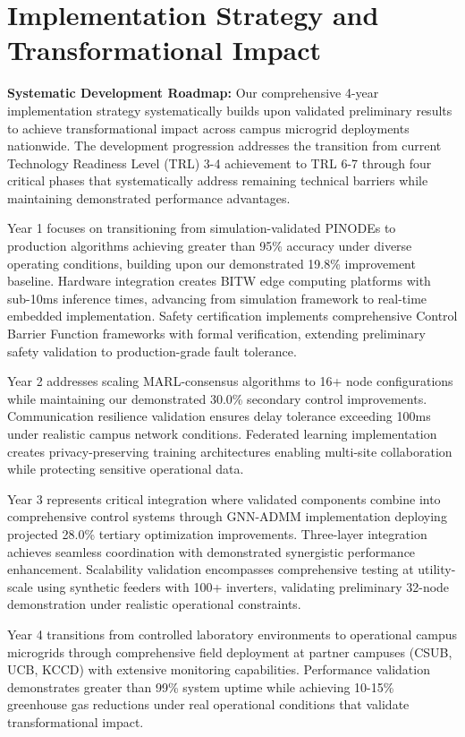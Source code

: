 \documentclass[12pt]{article}
\begin{document}
\section{Implementation Strategy and Transformational Impact}

\textbf{Systematic Development Roadmap:} Our comprehensive 4-year implementation strategy systematically builds upon validated preliminary results to achieve transformational impact across campus microgrid deployments nationwide. The development progression addresses the transition from current Technology Readiness Level (TRL) 3-4 achievement to TRL 6-7 through four critical phases that systematically address remaining technical barriers while maintaining demonstrated performance advantages.

Year 1 focuses on transitioning from simulation-validated PINODEs to production algorithms achieving greater than 95\% accuracy under diverse operating conditions, building upon our demonstrated 19.8\% improvement baseline. Hardware integration creates BITW edge computing platforms with sub-10ms inference times, advancing from simulation framework to real-time embedded implementation. Safety certification implements comprehensive Control Barrier Function frameworks with formal verification, extending preliminary safety validation to production-grade fault tolerance.

Year 2 addresses scaling MARL-consensus algorithms to 16+ node configurations while maintaining our demonstrated 30.0\% secondary control improvements. Communication resilience validation ensures delay tolerance exceeding 100ms under realistic campus network conditions. Federated learning implementation creates privacy-preserving training architectures enabling multi-site collaboration while protecting sensitive operational data.

Year 3 represents critical integration where validated components combine into comprehensive control systems through GNN-ADMM implementation deploying projected 28.0\% tertiary optimization improvements. Three-layer integration achieves seamless coordination with demonstrated synergistic performance enhancement. Scalability validation encompasses comprehensive testing at utility-scale using synthetic feeders with 100+ inverters, validating preliminary 32-node demonstration under realistic operational constraints.

Year 4 transitions from controlled laboratory environments to operational campus microgrids through comprehensive field deployment at partner campuses (CSUB, UCB, KCCD) with extensive monitoring capabilities. Performance validation demonstrates greater than 99\% system uptime while achieving 10-15\% greenhouse gas reductions under real operational conditions that validate transformational impact.
\end{document}
